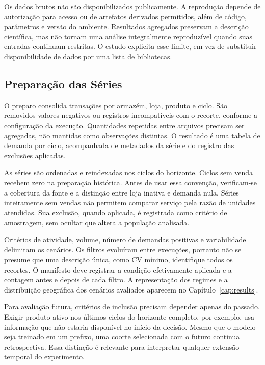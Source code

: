 Os dados brutos não são disponibilizados publicamente. A reprodução depende de autorização para acesso ou de artefatos derivados permitidos, além de código, parâmetros e versão do ambiente. Resultados agregados preservam a descrição científica, mas não tornam uma análise integralmente reproduzível quando suas entradas continuam restritas. O estudo explicita esse limite, em vez de substituir disponibilidade de dados por uma lista de bibliotecas.

\subsection{Preparação das Séries}
\label{sec:pipeline_experimental}

O preparo consolida transações por armazém, loja, produto e ciclo. São removidos valores negativos ou registros incompatíveis com o recorte, conforme a configuração da execução. Quantidades repetidas entre arquivos precisam ser agregadas, não mantidas como observações distintas. O resultado é uma tabela de demanda por ciclo, acompanhada de metadados da série e do registro das exclusões aplicadas.

As séries são ordenadas e reindexadas nos ciclos do horizonte. Ciclos sem venda recebem zero na preparação histórica. Antes de usar essa convenção, verificam-se a cobertura da fonte e a distinção entre loja inativa e demanda nula. Séries inteiramente sem vendas não permitem comparar serviço pela razão de unidades atendidas. Sua exclusão, quando aplicada, é registrada como critério de amostragem, sem ocultar que altera a população analisada.

Critérios de atividade, volume, número de demandas positivas e variabilidade delimitam os cenários. Os filtros evoluíram entre execuções, portanto não se presume que uma descrição única, como CV mínimo, identifique todos os recortes. O manifesto deve registrar a condição efetivamente aplicada e a contagem antes e depois de cada filtro. A representação dos regimes e a distribuição geográfica dos cenários avaliados aparecem no Capítulo~\ref{cap:results}.

Para avaliação futura, critérios de inclusão precisam depender apenas do passado. Exigir produto ativo nos últimos ciclos do horizonte completo, por exemplo, usa informação que não estaria disponível no início da decisão. Mesmo que o modelo seja treinado em um prefixo, uma coorte selecionada com o futuro continua retrospectiva. Essa distinção é relevante para interpretar qualquer extensão temporal do experimento.

